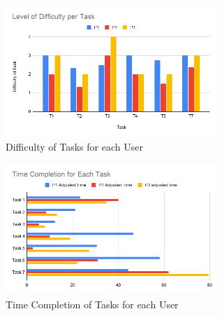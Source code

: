 



\begin{figure}[H]
    \centering
    \includegraphics[width=8cm]{NewFigures/DifficultyTask.png}
    \caption{Difficulty of Tasks for each User}
    \label{fig:DifficultyofTask}
\end{figure}
\begin{figure}[H]
    \centering
    \includegraphics[width=8cm]{NewFigures/AllTime.png}
    \caption{Time Completion of Tasks for each User}
    \label{fig:TimeofTask}
\end{figure}

